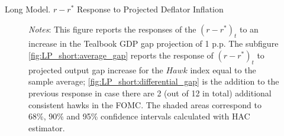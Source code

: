 \documentclass[10pt,aspectratio=169]{beamer}
\begin{document}
\begin{frame}{Long Model. $r-r^*$ Response to Projected Deflator Inflation}
\begin{figure}[!htbp]
\begin{subfigure}[b]{0.48\textwidth}
        \end{subfigure}\vspace{-4ex}
            {\begin{flushleft}\tiny\textit{Notes}: This figure reports the responses of the $(r-r^*)_t$ to an increase in the Tealbook GDP gap projection of 1 p.p. The subfigure \ref{fig:LP_short:average_gap} reports the response of $(r-r^*)_t$ to projected output gap increase for the $\mathit{Hawk}$ index equal to the sample average; \ref{fig:LP_short:differential_gap} is the addition to the previous response in case there are 2 (out of 12 in total) additional consistent hawks in the FOMC. The shaded areas correspond to 68\%, 90\% and 95\% confidence intervals calculated with \cite{Andrews1991} HAC estimator. \end{flushleft}}
    \end{figure}
    
\end{frame}
\end{document}
